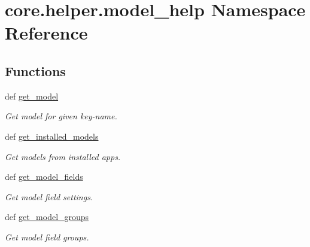 \hypertarget{namespacecore_1_1helper_1_1model__help}{\section{core.\-helper.\-model\-\_\-help Namespace Reference}
\label{namespacecore_1_1helper_1_1model__help}
}
\subsection*{Functions}
\begin{DoxyCompactItemize}
\item 
def \hyperlink{namespacecore_1_1helper_1_1model__help_a2f17d8518a77743ce8dcb1e2fdb7d356}{get\-\_\-model}
\begin{DoxyCompactList}\small\item\em Get model for given key-\/name. \end{DoxyCompactList}\item 
def \hyperlink{namespacecore_1_1helper_1_1model__help_a498e90521cbf327f52440ef3ab26ee1f}{get\-\_\-installed\-\_\-models}
\begin{DoxyCompactList}\small\item\em Get models from installed apps. \end{DoxyCompactList}\item 
def \hyperlink{namespacecore_1_1helper_1_1model__help_aecfd965d5110a1338bc7e8064f00c653}{get\-\_\-model\-\_\-fields}
\begin{DoxyCompactList}\small\item\em Get model field settings. \end{DoxyCompactList}\item 
def \hyperlink{namespacecore_1_1helper_1_1model__help_a4a997f56dbeb742710336c2ddb9e321e}{get\-\_\-model\-\_\-groups}
\begin{DoxyCompactList}\small\item\em Get model field groups. \end{DoxyCompactList}\end{DoxyCompactItemize}


